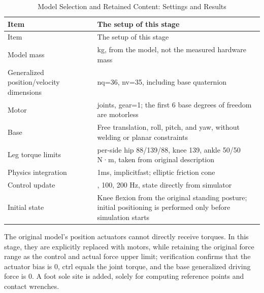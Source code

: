 \FloatBarrier\begingroup\small\setlength{\tabcolsep}{2.5pt}
\begin{longtable}[]{@{}
  >{\raggedright\arraybackslash}p{}
  >{\raggedright\arraybackslash}p{}@{}}
\caption{Model Selection and Retained Content: Settings and Results}\label{tab:s25-1}\tabularnewline
\toprule\noalign{}
\begin{minipage}[b]{\linewidth}\raggedright
Item
\end{minipage} & \begin{minipage}[b]{\linewidth}\raggedright
The setup of this stage
\end{minipage} \\
\midrule\noalign{}
\endfirsthead
\toprule\noalign{}
\begin{minipage}[b]{\linewidth}\raggedright
Item
\end{minipage} & \begin{minipage}[b]{\linewidth}\raggedright
The setup of this stage
\end{minipage} \\
\midrule\noalign{}
\endhead
\bottomrule\noalign{}
\endlastfoot
Model mass & 33.341142 kg, from the model, not the measured hardware mass \\
Generalized position/velocity dimensions & nq=36, nv=35, including base quaternion \\
Motor & 29 joints, gear=1; the first 6 base degrees of freedom are motorless \\
Base & Free translation, roll, pitch, and yaw, without welding or planar constraints \\
Leg torque limits & per-side hip 88/139/88, knee 139, ankle 50/50 N·m, taken from original description \\
Physics integration & 1ms, implicitfast; elliptic friction cone \\
Control update & 50, 100, 200 Hz, state directly from simulator \\
Initial state & Knee flexion from the original standing posture; initial positioning is performed only before simulation starts \\
\end{longtable}\endgroup

The original model's position actuators cannot directly receive torques. In this stage, they are explicitly replaced with motors, while retaining the original force range as the control and actual force upper limit; verification confirms that the actuator bias is 0, ctrl equals the joint torque, and the base generalized driving force is 0. A foot sole site is added, solely for computing reference points and contact wrenches.


